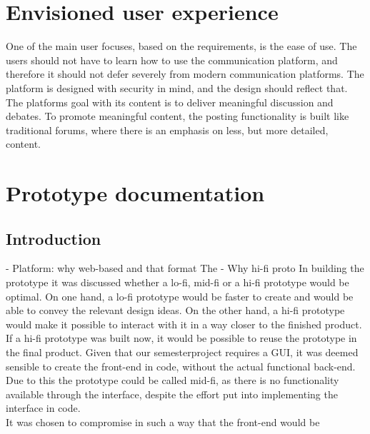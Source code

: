 \section{Envisioned user experience}
One of the main user focuses, based on the requirements, is the ease of use. The users should not have to learn how to use the communication platform, and therefore it should not defer severely from modern communication platforms. The platform is designed with security in mind, and the design should reflect that. The platforms goal with its content is to deliver meaningful discussion and debates. To promote meaningful content, the posting functionality is built like traditional forums, where there is an emphasis on less, but more detailed, content.  

\section{Prototype documentation}
\subsection{Introduction}
- Platform: why web-based and that format
The 
- Why hi-fi proto
In building the prototype it was discussed whether a lo-fi, mid-fi or a hi-fi prototype would be optimal. On one hand, a lo-fi prototype would be faster to create and would be able to convey the relevant design ideas. On the other hand, a hi-fi prototype would make it possible to interact with it in a way closer to the finished product. If a hi-fi prototype was built now, it would be possible to reuse the prototype in the final product. Given that our semesterproject requires a GUI, it was deemed sensible to create the front-end in code, without the actual functional back-end. Due to this the prototype could be called mid-fi, as there is no functionality available through the interface, despite the effort put into implementing the interface in code.
\\
\noindent
It was chosen to compromise in such a way that the front-end would be 

